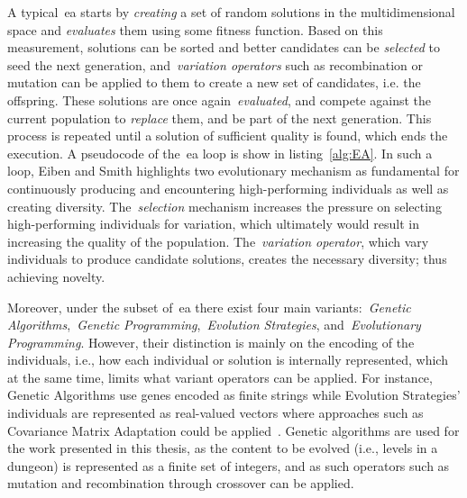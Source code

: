 A typical~\acrshort{ea} starts by \emph{creating} a set of random solutions in the multidimensional space and \emph{evaluates} them using some fitness function. Based on this measurement, solutions can be sorted and better candidates can be \emph{selected} to seed the next generation, and~\emph{variation operators} such as recombination or mutation can be applied to them to create a new set of candidates, i.e. the offspring. These solutions are once again~\emph{evaluated}, and compete against the current population to \emph{replace} them, and be part of the next generation. This process is repeated until a solution of sufficient quality is found, which ends the execution. A pseudocode of the~\acrshort{ea} loop is show in listing~\ref{alg:EA}. In such a loop, Eiben and Smith highlights two evolutionary mechanism as fundamental for continuously producing and encountering high-performing individuals as well as creating diversity. The~\emph{selection} mechanism increases the pressure on selecting high-performing individuals for variation, which ultimately would result in increasing the quality of the population. The~\emph{variation operator}, which vary individuals to produce candidate solutions, creates the necessary diversity; thus achieving novelty. 

Moreover, under the subset of~\acrshort{ea} there exist four main variants:~\emph{Genetic Algorithms},~\emph{Genetic Programming},~\emph{Evolution Strategies}, and~\emph{Evolutionary Programming}. However, their distinction is mainly on the encoding of the individuals, i.e., how each individual or solution is internally represented, which at the same time, limits what variant operators can be applied. For instance, Genetic Algorithms use genes encoded as finite strings while Evolution Strategies' individuals are represented as real-valued vectors where approaches such as Covariance Matrix Adaptation could be applied~\cite{fontaine2019covariance}. Genetic algorithms are used for the work presented in this thesis, as the content to be evolved (i.e., levels in a dungeon) is represented as a finite set of integers, and as such operators such as mutation and recombination through crossover can be applied.

